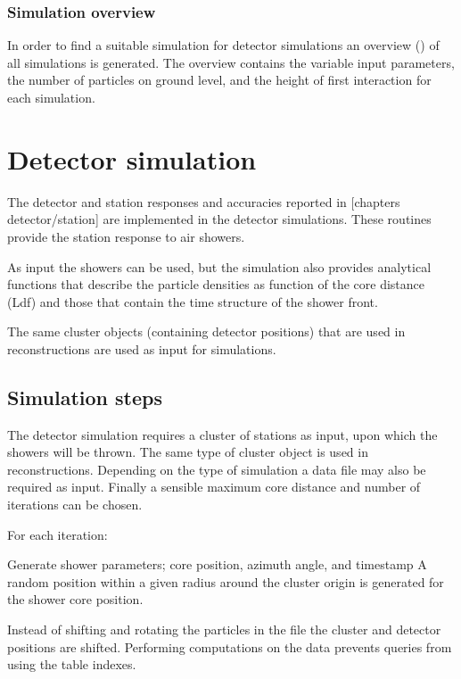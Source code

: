 \subsubsection{Simulation overview}

In order to find a suitable \corsika simulation for detector simulations
an overview (\hdf) of all \corsika simulations is generated. The
overview contains the variable input parameters, the number of particles
on ground level, and the height of first interaction for each
simulation.


\section{Detector simulation}

The detector and station responses and accuracies reported in [chapters
detector/station] are implemented in the detector simulations. These
routines provide the station response to air showers.

As input the \corsika showers can be used, but the simulation also
provides analytical functions that describe the particle densities as
function of the core distance (Ldf) and those that contain the time
structure of the shower front.

The same cluster objects (containing detector positions) that are used
in reconstructions are used as input for simulations.


\subsection{Simulation steps}

The detector simulation requires a cluster of stations as input, upon
which the showers will be thrown. The same type of cluster object is
used in reconstructions. Depending on the type of simulation a \corsika
data file may also be required as input. Finally a sensible maximum core
distance and number of iterations can be chosen.

For each iteration:

Generate shower parameters; core position, azimuth angle, and timestamp
A random position within a given radius around the cluster origin is
generated for the shower core position.

Instead of shifting and rotating the particles in the \corsika file the
cluster and detector positions are shifted. Performing computations on
the \corsika data prevents queries from using the table indexes.

